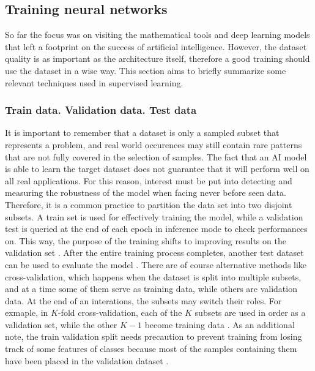 \subsection{Training neural networks}
\label{subsec:ch3sec3subsec7}

So far the focus was on visiting the mathematical tools and deep learning models that left a footprint on the success of artificial intelligence. However, the dataset quality is as important as the architecture itself, therefore a good training should use the dataset in a wise way. This section aims to briefly summarize some relevant techniques used in supervised learning.

\subsubsection{Train data. Validation data. Test data}
\label{subsubsec:ch3sec3subsec7subsubsec1}

It is important to remember that a dataset is only a sampled subset that represents a problem, and real world occurences may still contain rare patterns that are not fully covered in the selection of samples. The fact that an AI model is able to learn the target dataset does not guarantee that it will perform well on all real applications. For this reason, interest must be put into detecting and measuring the robustness of the model when facing never before seen data. Therefore, it is a common practice to partition the data set into two disjoint subsets. A train set is used for effectively training the model, while a validation test is queried at the end of each epoch in inference mode to check performances on. This way, the purpose of the training shifts to improving results on the validation set \cite{data_col}. After the entire training process completes, another test dataset can be used to evaluate the model \cite{train_val_test}. There are of course alternative methods like cross-validation, which happens when the dataset is split into multiple subsets, and at a time some of them serve as training data, while others are validation data. At the end of an interations, the subsets may switch their roles. For exmaple, in $K$-fold cross-validation, each of the $K$ subsets are used in order as a validation set, while the other $K-1$ become training data \cite{train_val_test}. As an additional note, the train validation split needs precaution to prevent training from losing track of some features of classes because most of the samples containing them have been placed in the validation dataset \cite{train_val_test}.

